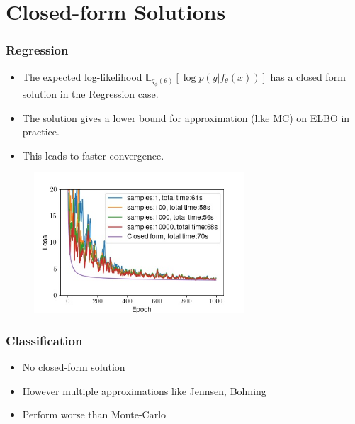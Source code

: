 \documentclass{beamer}
\begin{document}
        \section{Closed-form Solutions}
        \begin{frame}
            \frametitle{Regression}
            \begin{itemize}
                \item The expected log-likelihood $\mathbb{E}_{q_{\phi}(\theta)}[\log{p(y \vert f_{\theta}(x))}]$ has a closed form solution in the Regression case.
                \item The solution gives a lower bound for approximation (like MC) on ELBO in practice.
                \item This leads to faster convergence.
            \end{itemize}
            \begin{figure}
                \includegraphics[width=0.7\textwidth]{images/Regression/CFvsMC.jpg}
            \end{figure}
        \end{frame}

        \begin{frame}
            \frametitle{Classification}
            \begin{itemize}
                \item No closed-form solution
                \item However multiple approximations like Jennsen, Bohning
                \item Perform worse than Monte-Carlo
            \end{itemize}
        \end{frame}
        
\end{document}
